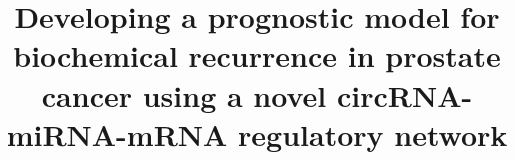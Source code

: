 \documentclass[twocolumn]{bmcart}%
\begin{document}
\begin{frontmatter}

\begin{fmbox}


\title{Developing a prognostic model for biochemical recurrence in prostate cancer using a novel circRNA-miRNA-mRNA regulatory network}


\author[
  addressref={aff1},                   %
    email={b.digby1@universityofgalway.ie}  %
]{ }
\author[
  addressref={aff2},
  email={Stephen.Finn@tcd.ie}
]{ }
\author[
  addressref={aff1},
  email={pilib.obroin@universityofgalway.ie}
]{ }



\address[id=aff1]{%
  ,             %
  ,          %
  ,                              %
}
\address[id=aff2]{%
  ,
  ,
  ,
}


\end{fmbox}
\end{frontmatter}
\end{document}
